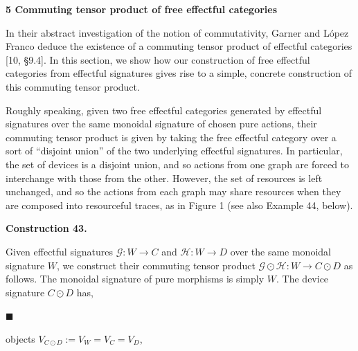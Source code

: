 \documentclass[10pt,a4paper]{article}
\begin{document}


 
\par\medskip\noindent\textbf{5 Commuting tensor product of free effectful categories}\par
 
 
In their abstract investigation of the notion of commutativity, Garner and López Franco deduce the existence of a commuting tensor product of effectful categories [10, §9.4]. In this section, we show how our construction of free effectful categories from effectful signatures gives rise to a simple, concrete construction of this commuting tensor product.\par
 
 
 
Roughly speaking, given two free effectful categories generated by effectful signatures over the same monoidal signature of chosen pure actions, their commuting tensor product is given by taking the free effectful category over a sort of “disjoint union” of the two underlying effectful signatures. In particular, the set of devices is a disjoint union, and so actions from one graph are forced to interchange with those from the other. However, the set of resources is left unchanged, and so the actions from each graph may share resources when they are composed into resourceful traces, as in Figure 1 (see also Example 44, below).\par
 
 
 
\par\medskip\noindent\textbf{Construction 43.}\par
 
 
Given effectful signatures $\mathcal{G}:W\to C$ and $\mathcal{H}:W\to D$ over the same monoidal signature $W$, we construct their commuting tensor product $\mathcal{G\odot H}:W\to C\odot D$ as follows. The monoidal signature of pure morphisms is simply $W$. The device signature $C\odot D$ has,\par
  
\par\noindent  $\blacksquare$ 
 
objects $V_{C\odot D}:=V_{W}=V_{C}=V_{D}$,\par
 
\end{document}
